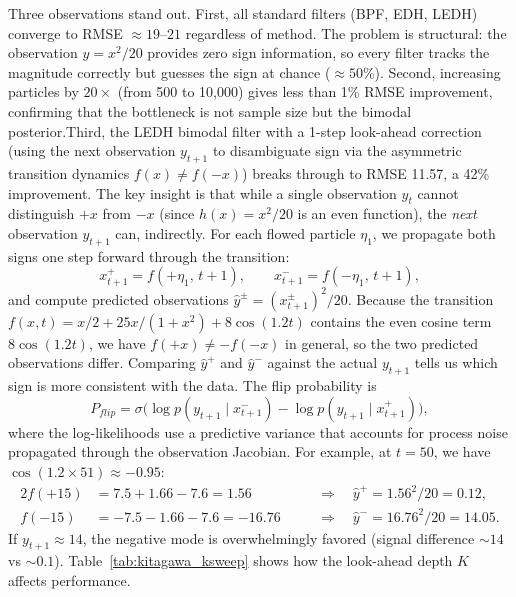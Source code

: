 \documentclass{article}
\begin{document}
Three observations stand out. First, all standard filters (BPF, EDH, LEDH) converge to RMSE $\approx 19$--$21$ regardless of method. The problem is structural: the observation $y = x^2/20$ provides zero sign information, so every filter tracks the magnitude correctly but guesses the sign at chance ($\approx 50\%$). 
Second, increasing particles by $20\times$ (from 500 to 10,000) gives less than 1\% RMSE improvement, confirming that the bottleneck is not sample size but the bimodal posterior.Third, the LEDH bimodal filter with a 1-step look-ahead correction (using the next observation $y_{t+1}$ to disambiguate sign via the asymmetric transition dynamics $f(x) \neq f(-x)$) breaks through to RMSE 11.57, a 42\% improvement. 
The key insight is that while a single observation $y_t$ cannot distinguish $+x$ from $-x$ (since $h(x) = x^2/20$ is an even function), the \emph{next} observation $y_{t+1}$ can, indirectly. For each flowed particle $\eta_1$, we propagate both signs one step forward through the transition:
\begin{equation}
x_{t+1}^{+} = f(+\eta_1,\, t\!+\!1), \qquad x_{t+1}^{-} = f(-\eta_1,\, t\!+\!1),
\end{equation}
and compute predicted observations $\hat{y}^{\pm} = (x_{t+1}^{\pm})^2/20$. Because the transition $f(x,t) = x/2 + 25x/(1+x^2) + 8\cos(1.2t)$ contains the even cosine term $8\cos(1.2t)$, we have $f(+x) \neq -f(-x)$ in general, so the two predicted observations differ. Comparing $\hat{y}^+$ and $\hat{y}^-$ against the actual $y_{t+1}$ tells us which sign is more consistent with the data. The flip probability is
\begin{equation}
P_{flip} = \sigma\!\Big(\log p(y_{t+1} \mid x_{t+1}^{-}) - \log p(y_{t+1} \mid x_{t+1}^{+})\Big),
\end{equation}
where the log-likelihoods use a predictive variance that accounts for process noise propagated through the observation Jacobian. For example, at $t = 50$, we have $\cos(1.2 \times 51) \approx -0.95$:
\begin{alignat*}{2}
f(+15) &= 7.5 + 1.66 - 7.6 = 1.56 &\quad&\Longrightarrow\quad \hat{y}^{+} = 1.56^2/20 = 0.12, \\
f(-15) &= -7.5 - 1.66 - 7.6 = -16.76 &\quad&\Longrightarrow\quad \hat{y}^{-} = 16.76^2/20 = 14.05.
\end{alignat*}
If $y_{t+1} \approx 14$, the negative mode is overwhelmingly favored (signal difference $\sim 14$ vs $\sim 0.1$). Table~\ref{tab:kitagawa_ksweep} shows how the look-ahead depth $K$ affects performance.
\end{document}
